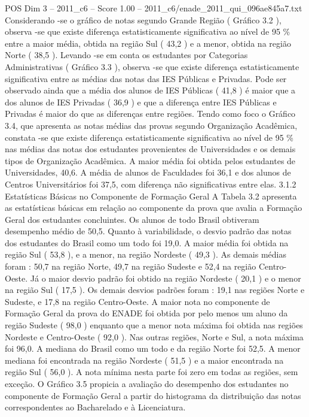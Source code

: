 \begin{textsample}{POS Dim 3 – 2011\_c6 – Score 1.00 – 2011\_c6/enade\_2011\_qui\_096ae845a7.txt}
Considerando -se o gráfico de notas segundo Grande Região ( Gráfico 3.2 ), observa -se que existe diferença estatisticamente significativa ao nível de 95 \% entre a maior média, obtida na região Sul ( 43,2 ) e a menor, obtida na região Norte ( 38,5 ).
Levando -se em conta os estudantes por Categorias Administrativas ( Gráfico 3.3 ), observa -se que existe diferença estatisticamente significativa entre as médias das notas das IES Públicas e Privadas.
Pode ser observado ainda que a média dos alunos de IES Públicas ( 41,8 ) é maior que a dos alunos de IES Privadas ( 36,9 ) e que a diferença entre IES Públicas e Privadas é maior do que as diferenças entre regiões.
Tendo como foco o Gráfico 3.4, que apresenta as notas médias das provas segundo Organização Acadêmica, constata -se que existe diferença estatisticamente significativa ao nível de 95 \% nas médias das notas dos estudantes provenientes de Universidades e os demais tipos de Organização Acadêmica.
A maior média foi obtida pelos estudantes de Universidades, 40,6.
A média de alunos de Faculdades foi 36,1 e dos alunos de Centros Universitários foi 37,5, com diferença não significativas entre elas. 3.1.2 Estatísticas Básicas no Componente de Formação Geral A Tabela 3.2 apresenta as estatísticas básicas em relação ao componente da prova que avalia a Formação Geral dos estudantes concluintes.
Os alunos de todo Brasil obtiveram desempenho médio de 50,5.
Quanto à variabilidade, o desvio padrão das notas dos estudantes do Brasil como um todo foi 19,0.
A maior média foi obtida na região Sul ( 53,8 ), e a menor, na região Nordeste ( 49,3 ).
As demais médias foram : 50,7 na região Norte, 49,7 na região Sudeste e 52,4 na região Centro-Oeste.
Já o maior desvio padrão foi obtido na região Nordeste ( 20,1 ) e o menor na região Sul ( 17,5 ).
Os demais desvios padrões foram : 19,1 nas regiões Norte e Sudeste, e 17,8 na região Centro-Oeste.
A maior nota no componente de Formação Geral da prova do ENADE foi obtida por pelo menos um aluno da região Sudeste ( 98,0 ) enquanto que a menor nota máxima foi obtida nas regiões Nordeste e Centro-Oeste ( 92,0 ).
Nas outras regiões, Norte e Sul, a nota máxima foi 96,0.
A mediana do Brasil como um todo e da região Norte foi 52,5.
A menor mediana foi encontrada na região Nordeste ( 51,5 ) e a maior encontrada na região Sul ( 56,0 ).
A nota mínima nesta parte foi zero em todas as regiões, sem exceção.
O Gráfico 3.5 propicia a avaliação do desempenho dos estudantes no componente de Formação Geral a partir do histograma da distribuição das notas correspondentes ao Bacharelado e à Licenciatura.

\end{textsample}
